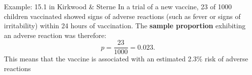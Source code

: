 \documentclass[compress, notes=hide]{beamer}
\newcommand{\hl}[1]{\textbf{#1}}
\begin{document}
 \begin{frame}
	\begin{block}{Example: 15.1 in Kirkwood \& Sterne}
		In a trial of a new vaccine, 23 of 1000 children vaccinated showed
		signs of adverse reactions (such as fever or signs of irritability)
		within 24 hours of vaccination. The \hl{sample proportion}
		exhibiting an adverse reaction was therefore:
		\begin{equation*}
			p = \frac{23}{1000} = 0.023.
		\end{equation*}
		This means that the vaccine is associated with an estimated 2.3\% risk of adverse reactions
	\end{block}
\end{frame}




\end{document}

